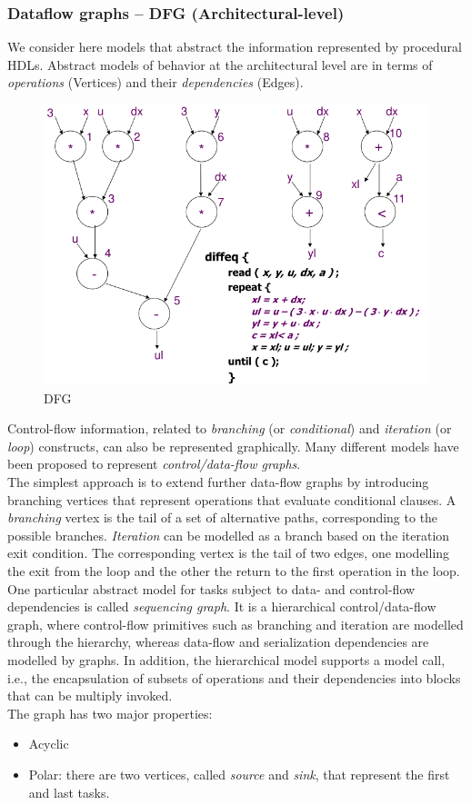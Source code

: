 \subsubsection{Dataflow graphs – DFG (Architectural-level)}
We consider here models that abstract the information represented by procedural HDLs. Abstract models of behavior at the architectural level are in terms of  \textit{operations}  (Vertices)  and their  \textit{dependencies} (Edges).
\begin{figure}[H]
	\centering
	\includegraphics[height=45 mm]{./Cap2/Images/Image08.png}
	\caption[Optional caption]{DFG}
	\label{fig:DFG}
\end{figure}
Control-flow information, related to  \textit{branching}  (or  \textit{conditional})  and  \textit{iteration} (or  \textit{loop})  constructs, can also be represented graphically. Many different models have been proposed to represent \textit{control/data-flow graphs}.\\
The simplest approach is to extend further data-flow graphs by introducing branching vertices that represent operations that evaluate conditional clauses.  A  \textit{branching} vertex is the tail of a set of alternative paths, corresponding to the possible branches. \textit{Iteration} can be modelled as a branch based on the iteration exit condition. The corresponding vertex is the tail of two edges, one modelling the exit from the loop and the other the return to the first operation in the loop.\\
One particular abstract model for tasks subject to data- and control-flow dependencies is called \textit{sequencing graph}. It is a hierarchical control/data-flow graph, where control-flow primitives such as branching and iteration are modelled through the hierarchy, whereas data-flow and serialization dependencies are modelled by graphs. In addition, the hierarchical model supports a  model call,  i.e., the encapsulation of subsets of operations and their dependencies into blocks that can be multiply invoked.\\
The graph has two major properties:
\begin{itemize}
\item Acyclic
\item Polar: there are two vertices, called  \textit{source}  and  \textit{sink},  that represent the first and last tasks.
\end{itemize}
